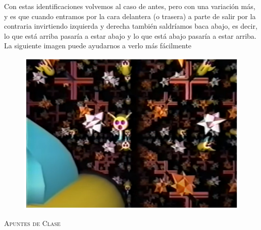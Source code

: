 \begin{enumerate}
Con estas identificaciones volvemos al caso de antes, pero con una variación más, y es que cuando entramos por la cara delantera (o trasera) a parte de salir por la contraria invirtiendo izquierda y derecha también saldríamos baca abajo, es decir, lo que está arriba pasaría a estar abajo y lo que está abajo pasaría a estar arriba. La siguiente imagen puede ayudarnos a verlo más fácilmente 

\begin{figure}[H]
	\centering
	\includegraphics[scale=0.5]{images/universo/universo_3_2.png}
\end{figure}
\end{enumerate}






\newpage
\begin{thebibliography}{X}

 \textsc{Apuntes de Clase}

\end{thebibliography}




